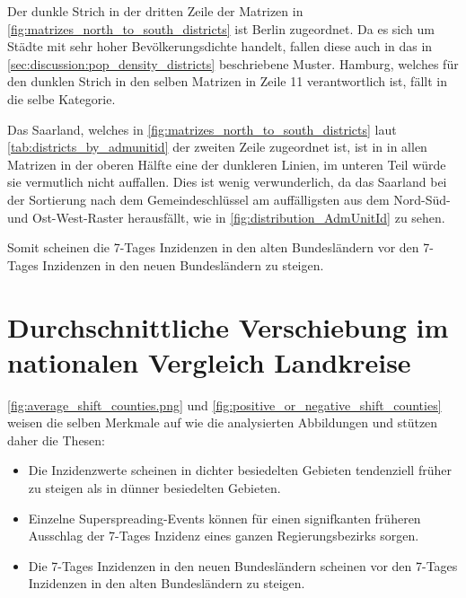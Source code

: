 Der dunkle Strich in der dritten Zeile der Matrizen in \autoref{fig:matrizes_north_to_south_districts} ist Berlin zugeordnet. Da es sich um Städte mit sehr hoher Bevölkerungsdichte handelt, fallen diese auch in das in \autoref{sec:discussion:pop_density_districts} beschriebene Muster. Hamburg, welches für den dunklen Strich in den selben Matrizen in Zeile 11 verantwortlich ist, fällt in die selbe Kategorie.

Das Saarland, welches in \autoref{fig:matrizes_north_to_south_districts} laut \autoref{tab:districts_by_admunitid} der zweiten Zeile zugeordnet ist, ist in in allen Matrizen in der oberen Hälfte eine der dunkleren Linien, im unteren Teil würde sie vermutlich nicht auffallen.
Dies ist wenig verwunderlich, da das Saarland bei der Sortierung nach dem Gemeindeschlüssel am auffälligsten aus dem Nord-Süd- und Ost-West-Raster herausfällt, wie in \autoref{fig:distribution_AdmUnitId} zu sehen.

Somit scheinen die 7-Tages Inzidenzen in den alten Bundesländern vor den 7-Tages Inzidenzen in den neuen Bundesländern zu steigen.


\section{Durchschnittliche Verschiebung im nationalen Vergleich Landkreise}

\autoref{fig:average_shift_counties.png} und
\autoref{fig:positive_or_negative_shift_counties} weisen die selben Merkmale auf wie die analysierten Abbildungen  und stützen daher die Thesen:

\begin{itemize}
    \item Die Inzidenzwerte scheinen in dichter besiedelten Gebieten tendenziell früher zu steigen als in dünner besiedelten Gebieten.
    \item Einzelne Superspreading-Events können für einen signifkanten früheren Ausschlag der 7-Tages Inzidenz eines ganzen Regierungsbezirks sorgen.
    \item Die 7-Tages Inzidenzen in den neuen Bundesländern scheinen vor den 7-Tages Inzidenzen in den alten Bundesländern zu steigen.
\end{itemize}
